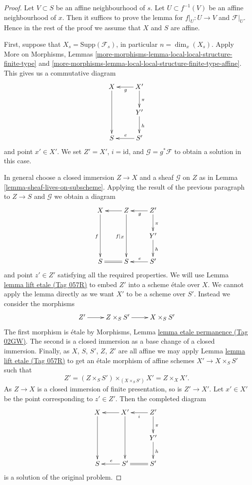 \documentclass{amsart}
\theoremstyle{plain}
\theoremstyle{definition}
\theoremstyle{remark}
\numberwithin{equation}{subsection}
\begin{document}
\begin{proof}
Let $V \subset S$ be an affine neighbourhood of $s$.
Let $U \subset f^{-1}(V)$ be an affine neighbourhood of $x$.
Then it suffices to prove the lemma for $f|_U : U \to V$ and
$\mathcal{F}|_U$. Hence in the rest of the proof we assume that
$X$ and $S$ are affine.

\medskip\noindent
First, suppose that $X_s = \text{Supp}(\mathcal{F}_s)$, in particular
$n = \dim_x(X_s)$. Apply
More on Morphisms,
Lemmas \ref{more-morphisms-lemma-local-local-structure-finite-type} and
\ref{more-morphisms-lemma-local-local-structure-finite-type-affine}.
This gives us a commutative diagram
$$
\xymatrix{
X \ar[dd] & X' \ar[l]^g \ar[d]^\pi \\
& Y' \ar[d]^h  \\
S & S' \ar[l]_e
}
$$
and point $x' \in X'$. We set $Z' = X'$, $i = \text{id}$, and
$\mathcal{G} = g^*\mathcal{F}$ to obtain a solution in this case.

\medskip\noindent
In general choose a closed immersion $Z \to X$ and a sheaf
$\mathcal{G}$ on $Z$ as in
Lemma \ref{lemma-sheaf-lives-on-subscheme}.
Applying the result of the previous paragraph to $Z \to S$ and
$\mathcal{G}$ we obtain a diagram
$$
\xymatrix{
X \ar[dd]_f & Z \ar[l] \ar[dd]_{f|_Z} & Z' \ar[l]^g \ar[d]^\pi \\
& & Y' \ar[d]^h \\
S & S \ar@{=}[l] & S' \ar[l]_e
}
$$
and point $z' \in Z'$ satisfying all the required properties.
We will use
Lemma \href{https://stacks.math.columbia.edu/tag/057R}{lemma lift etale (Tag 057R)}
to embed $Z'$ into a scheme \'etale over $X$. We cannot apply the lemma directly
as we want $X'$ to be a scheme over $S'$. Instead we
consider the morphisms
$$
\xymatrix{
Z' \ar[r] & Z \times_S S' \ar[r] & X \times_S S'
}
$$
The first morphism is \'etale by
Morphisms, Lemma \href{https://stacks.math.columbia.edu/tag/02GW}{lemma etale permanence (Tag 02GW)}.
The second is a closed immersion as a base change of a closed immersion.
Finally, as $X$, $S$, $S'$, $Z$, $Z'$ are all affine we may apply
Lemma \href{https://stacks.math.columbia.edu/tag/057R}{lemma lift etale (Tag 057R)}
to get an \'etale morphism of affine schemes $X' \to X \times_S S'$ such that
$$
Z' = (Z \times_S S') \times_{(X \times_S S')} X' = Z \times_X X'.
$$
As $Z \to X$ is a closed immersion of finite presentation, so is $Z' \to X'$.
Let $x' \in X'$ be the point corresponding to $z' \in Z'$.
Then the completed diagram
$$
\xymatrix{
X \ar[dd] & X' \ar[dd] \ar[l] & Z' \ar[l]^i \ar[d]^\pi \\
& & Y' \ar[d]^h \\
S & S' \ar[l]_e & S' \ar@{=}[l]
}
$$
is a solution of the original problem.
\end{proof}
\end{document}
